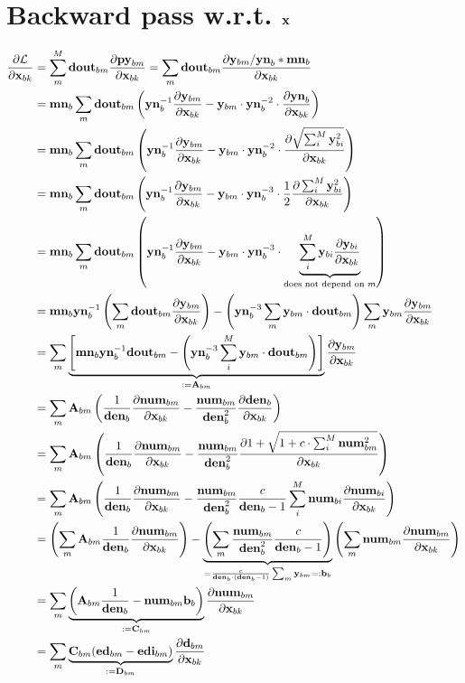\documentclass{article}
\begin{document}
\section{Backward pass w.r.t. $\v{x}$}

\begin{align*}
    \ddfrac{\mathcal{L}}{\v{x}{bk}} &= \sum_m^M \v{dout}{bm} \ddfrac{\v{py}{bm}}{\v{x}{bk}} = \sum_m \v{dout}{bm} \ddfrac{\v{y}{bm} / \v{yn}{b} * \v{mn}{b}}{\v{x}{bk}} \\
    &= \v{mn}{b} \sum_m \v{dout}{bm} \left(\v{yn}{b}^{-1} \ddfrac{\v{y}{bm}}{\v{x}{bk}} - \v{y}{bm} \cdot \v{yn}{b}^{-2} \cdot \ddfrac{\v{yn}{b}}{\v{x}{bk}} \right) \\
    &= \v{mn}{b} \sum_m \v{dout}{bm} \left(\v{yn}{b}^{-1} \ddfrac{\v{y}{bm}}{\v{x}{bk}} - \v{y}{bm} \cdot \v{yn}{b}^{-2} \cdot \ddfrac{\sqrt{\sum_i^M \v{y}_{bi}^2}}{\v{x}{bk}} \right) \\
    &= \v{mn}{b} \sum_m \v{dout}{bm} \left(\v{yn}{b}^{-1} \ddfrac{\v{y}{bm}}{\v{x}{bk}} - \v{y}{bm} \cdot \v{yn}{b}^{-3} \cdot \frac{1}{2} \ddfrac{\sum_i^M \v{y}_{bi}^2}{\v{x}{bk}} \right) \\
    &= \v{mn}{b} \sum_m \v{dout}{bm} \left(\v{yn}{b}^{-1} \ddfrac{\v{y}{bm}}{\v{x}{bk}} - \v{y}{bm} \cdot \v{yn}{b}^{-3} \cdot \underbrace{\sum_i^M \v{y}_{bi} \ddfrac{ \v{y}_{bi}}{\v{x}{bk}}}_{\text{does not depend on $m$}} \right) \\
    &= \v{mn}{b} \v{yn}{b}^{-1} \left( \sum_m \v{dout}{bm} \ddfrac{\v{y}{bm}}{\v{x}{bk}} \right) - \left(\v{yn}{b}^{-3} \sum_m \v{y}{bm} \cdot \v{dout}{bm} \right) \sum_m \v{y}{bm} \ddfrac{\v{y}{bm}}{\v{x}{bk}} \\
    &= \sum_m \underbrace{\left[ \v{mn}{b} \v{yn}{b}^{-1} \v{dout}{bm} - \left(\v{yn}{b}^{-3} \sum_i^M \v{y}{bm} \cdot \v{dout}{bm} \right) \right]}_{:= \v{A}{bm}} \ddfrac{\v{y}{bm}}{\v{x}{bk}} \\
    &= \sum_m \v{A}{bm} \left( \frac{1}{\v{den}{b}} \ddfrac{\v{num}{bm}}{\v{x}{bk}} - \frac{\v{num}{bm}}{\v{den}{b}^{2}} \ddfrac{\v{den}{b}}{\v{x}{bk}} \right) \\
    &= \sum_m \v{A}{bm} \left( \frac{1}{\v{den}{b}} \ddfrac{\v{num}{bm}}{\v{x}{bk}} - \frac{\v{num}{bm}}{\v{den}{b}^{2}} \ddfrac{1 + \sqrt{1 + c \cdot \sum_i^M \v{num}{bm}^2}}{\v{x}{bk}} \right) \\
    &= \sum_m \v{A}{bm} \left( \frac{1}{\v{den}{b}} \ddfrac{\v{num}{bm}}{\v{x}{bk}} - \frac{\v{num}{bm}}{\v{den}{b}^{2}} \frac{c}{\v{den}{b} - 1} \sum_i^M \v{num}{bi} \ddfrac{\v{num}{bi}}{\v{x}{bk}} \right) \\
    &= \left( \sum_m \v{A}{bm} \frac{1}{\v{den}{b}} \ddfrac{\v{num}{bm}}{\v{x}{bk}} \right) - \underbrace{\left(\sum_m \frac{\v{num}{bm}}{\v{den}{b}^{2}} \frac{c}{\v{den}{b} - 1} \right)}_{= \frac{c}{\v{den}{b} \cdot (\v{den}{b} - 1)} \sum_m \v{y}{bm} =: \v{b}{b}} \left( \sum_m \v{num}{bm} \ddfrac{\v{num}{bm}}{\v{x}{bk}} \right) \\
    &= \sum_m \underbrace{\left( \v{A}{bm} \frac{1}{\v{den}{b}} - \v{num}{bm} \v{b}{b} \right)}_{:= \v{C}{bm}} \ddfrac{\v{num}{bm}}{\v{x}{bk}} \\
    &= \sum_m \underbrace{\v{C}{bm} (\v{ed}_{bm} - \v{edi}_{bm})}_{:= \v{D}{bm}} \ddfrac{\v{d}{bm}}{\v{x}{bk}}
\end{align*}
\end{document}
